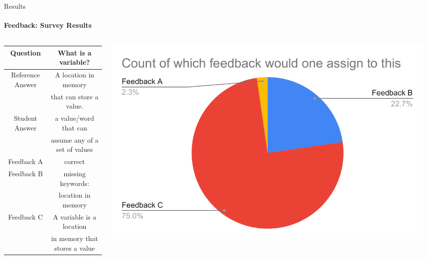 \documentclass[aspectratio=169]{beamer}
\begin{document}
\begin{frame}{Results}
	\framesubtitle{Feedback: Survey Results}
	\begin{columns}
		\begin{column}{0.65\textwidth}
		\begin{table}
			\begin{tabular}{ |c|c| }
				\hline
				Question & What is a variable?  
				\\ \hline 
				Reference Answer & A location in memory\\& that can store a value.
				\\ \hline
				Student Answer & a value/word that can\\& assume any of a set of values
				\\ \hline
				Feedback A & correct
				\\ \hline
				Feedback B & missing keywords:\\& location in memory
				\\ \hline
				Feedback C & A variable is a location\\& in memory that stores a value
				\\ \hline
			\end{tabular}
		\end{table}
	\end{column}
	\begin{column}{0.5\textwidth}
		\begin{center}
			\includegraphics[width=1\textwidth]{images/survey_1.pdf}
		\end{center}
	\end{column}
	\end{columns}
\end{frame}
\end{document}
